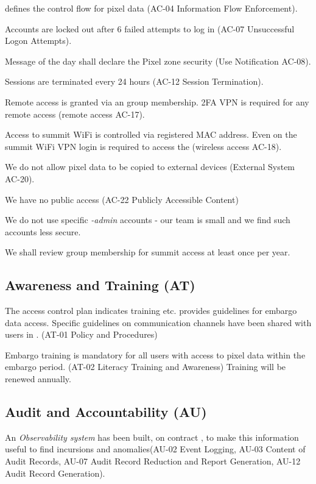  defines the control flow for pixel data (AC-04  Information Flow Enforcement).

Accounts are locked out after 6 failed attempts to log in (AC-07  Unsuccessful Logon Attempts).

Message of the day shall declare the Pixel zone security (Use Notification AC-08).

Sessions are terminated every 24 hours (AC-12  Session Termination).

Remote access is granted via an group membership. 2FA VPN is required for any remote access (remote access AC-17).

Access to summit WiFi is controlled via registered MAC address.
Even on the summit WiFi VPN login is required to access the \PZ (wireless access AC-18).


We do not allow pixel data to be copied to external devices (External System AC-20).

We have no public access (AC-22  Publicly Accessible Content)

We do not use specific \emph{-admin} accounts  - our team is small and we find such accounts less secure.

We shall review group membership for summit access at least once per year.



\subsection{Awareness and Training (AT)} \label{sec:AT}

The access control plan \citep{ACP} indicates training etc.
 provides guidelines for embargo data access.
Specific guidelines on communication channels have been shared with users in .
(AT-01  Policy and Procedures)

Embargo training is mandatory for all users with access to pixel data within the embargo period. (AT-02  Literacy Training and Awareness)
Training will be renewed annually.


\subsection{Audit and Accountability (AU)} \label{sec:AU}
An \emph{Observability system} has been built, on contract , to make this information useful to find incursions and anomalies(AU-02  Event Logging,  AU-03  Content of Audit Records, AU-07  Audit Record Reduction and Report Generation, AU-12  Audit Record Generation).

